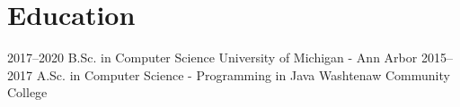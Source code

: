 \documentclass[]{cv-style}
\begin{document}

\section{Education}

\begin{entrylist}
\entry
{2017--2020}
{B.Sc. {\normalfont in Computer Science}}
{University of Michigan - Ann Arbor}
{\vspace{-0.3cm}}
\entry
{2015--2017}
{A.Sc. {\normalfont in Computer Science - Programming in Java}}
{Washtenaw Community College}

\end{entrylist}

\end{document}
